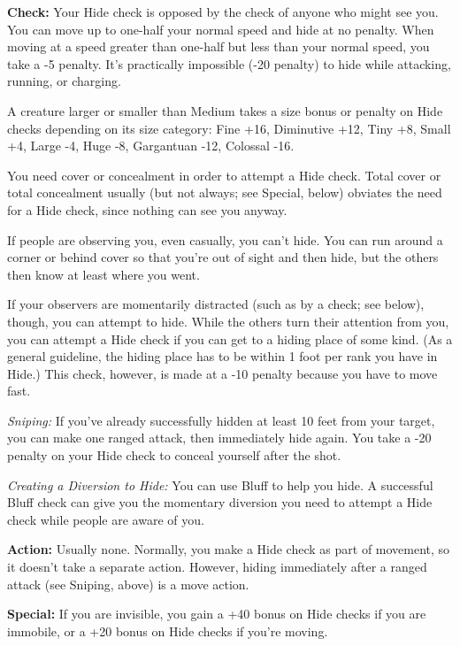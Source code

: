 
\textbf{Check:} Your Hide check is opposed by the  check of anyone who might see you. You can move up to one-half your normal speed and hide at no penalty. When moving at a speed greater than one-half but less than your normal speed, you take a -5 penalty. It's practically impossible (-20 penalty) to hide while attacking, running, or charging.

A creature larger or smaller than Medium takes a size bonus or penalty on Hide checks depending on its size category: Fine +16, Diminutive +12, Tiny +8, Small +4, Large -4, Huge -8, Gargantuan -12, Colossal -16.

You need cover or concealment in order to attempt a Hide check. Total cover or total concealment usually (but not always; see Special, below) obviates the need for a Hide check, since nothing can see you anyway.

If people are observing you, even casually, you can't hide. You can run around a corner or behind cover so that you're out of sight and then hide, but the others then know at least where you went.

If your observers are momentarily distracted (such as by a  check; see below), though, you can attempt to hide. While the others turn their attention from you, you can attempt a Hide check if you can get to a hiding place of some kind. (As a general guideline, the hiding place has to be within 1 foot per rank you have in Hide.) This check, however, is made at a -10 penalty because you have to move fast.

\textit{Sniping:} If you've already successfully hidden at least 10 feet from your target, you can make one ranged attack, then immediately hide again. You take a -20 penalty on your Hide check to conceal yourself after the shot.

\textit{Creating a Diversion to Hide:} You can use Bluff to help you hide. A successful Bluff check can give you the momentary diversion you need to attempt a Hide check while people are aware of you.

\textbf{Action:} Usually none. Normally, you make a Hide check as part of movement, so it doesn't take a separate action. However, hiding immediately after a ranged attack (see Sniping, above) is a move action.

\textbf{Special:} If you are invisible, you gain a +40 bonus on Hide checks if you are immobile, or a +20 bonus on Hide checks if you're moving.
